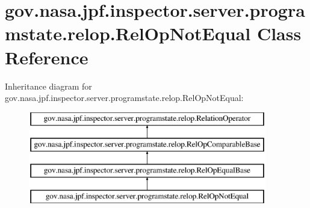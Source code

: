 \hypertarget{classgov_1_1nasa_1_1jpf_1_1inspector_1_1server_1_1programstate_1_1relop_1_1_rel_op_not_equal}{}\section{gov.\+nasa.\+jpf.\+inspector.\+server.\+programstate.\+relop.\+Rel\+Op\+Not\+Equal Class Reference}
\label{classgov_1_1nasa_1_1jpf_1_1inspector_1_1server_1_1programstate_1_1relop_1_1_rel_op_not_equal}
Inheritance diagram for gov.\+nasa.\+jpf.\+inspector.\+server.\+programstate.\+relop.\+Rel\+Op\+Not\+Equal\+:\begin{figure}[H]
\begin{center}
\leavevmode
\includegraphics[height=4.000000cm]{classgov_1_1nasa_1_1jpf_1_1inspector_1_1server_1_1programstate_1_1relop_1_1_rel_op_not_equal}
\end{center}
\end{figure}
